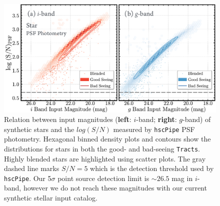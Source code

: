 \documentclass[useamsfonts]{pasj01}
\def\hscpipe{\texttt{hscPipe}}
\def\tracts{\texttt{Tracts}}
\begin{document}
\begin{figure}
    \begin{center}
        \includegraphics[width=\textwidth]{fig/synpipe_psf_sn}
    \end{center}
    \caption{
        Relation between input magnitudes (\textbf{left}: $i$-band; \textbf{right}:
        $g$-band) of synthetic stars and the $log(S/N)$ measured by \hscpipe{} PSF
        photometry.
        Hexagonal binned density plots and contours show the distributions for
        stars in both the good- and bad-seeing \tracts{}. 
        Highly blended stars are highlighted using scatter plots.
        The gray dashed line marks $S/N = 5$ which is the detection threshold used 
        by \hscpipe{}.  
        Our 5$\sigma$ point source detection limit is ${\sim}26.5$ mag in $i$-band,
        however we do not reach these magnitudes with our current synthetic stellar 
        input catalog.
        }
    \label{fig:star_sn}
\end{figure}
\end{document}
